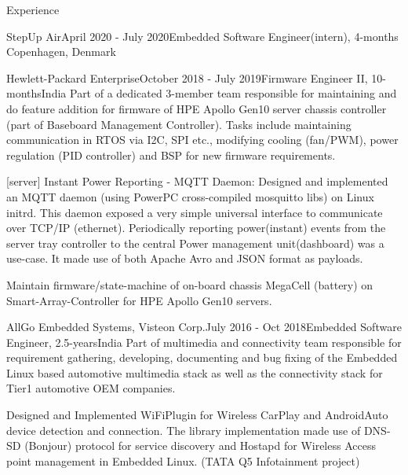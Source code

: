 \documentclass[
	a4paper, %
	11pt, %
]{resume} %
\begin{document}
\begin{rSection}{Experience}
\begin{rSubsection}{StepUp Air}{April 2020 - July 2020}{Embedded Software Engineer(intern), 4-months}{ Copenhagen, Denmark}
	\end{rSubsection}
 

	\begin{rSubsection}{Hewlett-Packard Enterprise}{October 2018 - July 2019}{Firmware Engineer II, 10-months}{India}
            Part of a dedicated 3-member team responsible for maintaining and do feature addition for firmware of HPE Apollo Gen10 server chassis controller (part of Baseboard Management Controller). Tasks include maintaining communication in RTOS via I2C, SPI etc., modifying cooling (fan/PWM), power regulation (PID controller) and BSP for new firmware requirements.

            [server] Instant Power Reporting - MQTT Daemon: Designed and implemented an MQTT daemon (using PowerPC cross-compiled mosquitto libs) on Linux initrd. This daemon exposed a very simple universal interface to communicate over TCP/IP (ethernet). Periodically reporting power(instant) events from the server tray controller to the central Power management unit(dashboard) was a use-case. It made use of both Apache Avro and JSON format as payloads.
            
            Maintain firmware/state-machine of on-board chassis MegaCell (battery) on Smart-Array-Controller for HPE
Apollo Gen10 servers.


	\end{rSubsection}

	\begin{rSubsection}{AllGo Embedded Systems, Visteon Corp.}{July 2016 - Oct 2018}{Embedded Software Engineer, 2.5-years}{India}
            Part of multimedia and connectivity team responsible for requirement gathering, developing, documenting and bug fixing of the Embedded Linux based automotive multimedia stack as well as the connectivity stack for Tier1 automotive OEM companies.

            Designed and Implemented WiFiPlugin for Wireless CarPlay and AndroidAuto device detection and connection. The library implementation made use of DNS-SD (Bonjour) protocol for service discovery and Hostapd for Wireless Access point management in Embedded Linux. (TATA Q5 Infotainment project) \hfill
            

\end{rSubsection}
\end{rSection}
\end{document}
